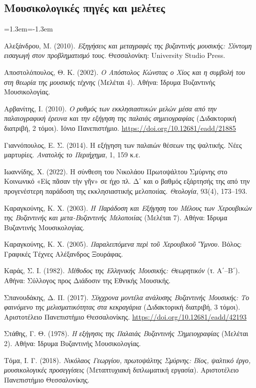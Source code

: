 \documentclass[a4paper]{article}
\newenvironment{reflist}{\begin{list}{}{\leftmargin=1.3em\itemindent=-1.3em\itemsep=0pt\parsep=0pt}\fontsize{9}{9.5}\selectfont}{\end{list}}
\begin{document}
\subsection*{Μουσικολογικές πηγές και μελέτες}
\begin{reflist}
\item Αλεξάνδρου, Μ. (2010). \emph{Εξηγήσεις και μεταγραφές της βυζαντινής μουσικής: Σύντομη εισαγωγή στον προβληματισμό τους}. Θεσσαλονίκη: University Studio Press.
\item Αποστολόπουλος, Θ. Κ. (2002). \emph{Ο Απόστολος Κώνστας ο Χίος και η συμβολή του στη θεωρία της μουσικής τέχνης} (Μελέται 4). Αθήνα: Ίδρυμα Βυζαντινής Μουσικολογίας.
\item Αρβανίτης, Ι. (2010). \emph{Ο ρυθμός των εκκλησιαστικών μελών μέσα από την παλαιογραφική έρευνα και την εξήγηση της παλαιάς σημειογραφίας} (Διδακτορική διατριβή, 2 τόμοι). Ιόνιο Πανεπιστήμιο. \url{https://doi.org/10.12681/eadd/21885}
\item Γιαννόπουλος, Ε. Σ. (2014). Η εξήγηση των παλαιών θέσεων της ψαλτικής. Νέες μαρτυρίες. \emph{Ανατολής το Περιήχημα}, 1, 159 κ.ε.
\item Ιωαννίδης, Χ. (2022). Η σύνθεση του Νικολάου Πρωτοψάλτου Σμύρνης στο Κοινωνικό «Εἰς πᾶσαν τὴν γῆν» σε ήχο πλ. Δ΄ και ο βαθμός εξάρτησής της από την προγενέστερη παράδοση της εκκλησιαστικής μελοποιίας. \emph{Θεολογία}, 93(4), 173--193.
\item Καραγκούνης, Κ. Χ. (2003). \emph{Η Παράδοση και Εξήγηση του Μέλους των Χερουβικών της Βυζαντινής και μετα-Βυζαντινής Μελοποιίας} (Μελέται 7). Αθήνα: Ίδρυμα Βυζαντινής Μουσικολογίας.
\item Καραγκούνης, Κ. Χ. (2005). \emph{Παραλειπόμενα περὶ τοῦ Χερουβικοῦ Ὕμνου}. Βόλος: Γραφικές Τέχνες Αλέξανδρος Ξουράφας.
\item Καράς, Σ. Ι. (1982). \emph{Μέθοδος της Ελληνικής Μουσικής: Θεωρητικόν} (τ. Α΄--Β΄). Αθήνα: Σύλλογος προς Διάδοσιν της Εθνικής Μουσικής.
\item Σπανουδάκης, Δ. Π. (2017). \emph{Σύγχρονα μοντέλα ανάλυσης Βυζαντινής Μουσικής: Το φαινόμενο της μελισματικότητας στα κεκραγάρια} (Διδακτορική διατριβή, 3 τόμοι). Αριστοτέλειο Πανεπιστήμιο Θεσσαλονίκης. \url{https://doi.org/10.12681/eadd/42193}
\item Στάθης, Γ. Θ. (1978). \emph{Η εξήγησις της Παλαιάς Βυζαντινής Σημειογραφίας} (Μελέται 2). Αθήνα: Ίδρυμα Βυζαντινής Μουσικολογίας.
\item Τόμα, Ι. Γ. (2018). \emph{Νικόλαος Γεωργίου, πρωτοψάλτης Σμύρνης: Βίος, ψαλτικό έργο, μουσικολογικές προσεγγίσεις} (Μεταπτυχιακή διπλωματική εργασία). Αριστοτέλειο Πανεπιστήμιο Θεσσαλονίκης.

\end{reflist}
\end{document}
